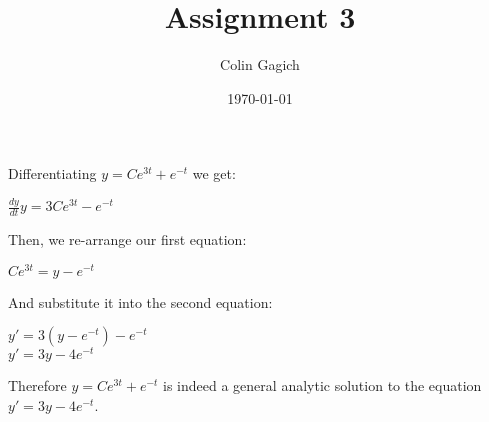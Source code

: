 \documentclass[]{article}
\title{Assignment 3}
\author{Colin Gagich}
\date{\today}
\begin{document}
\maketitle

\section{}

Differentiating $y = C e^{3t} + e^{-t}$ we get:

\begin{center}
$\frac{dy}{dt} y = 3 C e^{3t} - e^{-t}$
\end{center}

Then, we re-arrange our first equation:

\begin{center}
$C e^{3t} = y - e^{-t}$
\end{center}

And substitute it into the second equation:

\begin{center}
$y' = 3 (y - e^{-t}) - e^{-t}$ \\
$y' = 3 y - 4 e^{-t}$\\
\end{center}

\noindent Therefore $y = C e^{3t} + e^{-t}$ is indeed a general analytic solution to the equation $y' = 3 y - 4 e^{-t}$.
\end{document}
